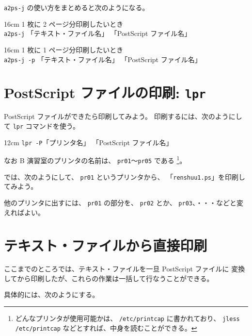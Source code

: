  \texttt{a2ps-j} の使い方をまとめると次のようになる。

\begin{coml}{16cm}
{\normalsize 1 枚に 2 ページ分印刷したいとき}\\
\texttt{a2ps-j} 「テキスト・ファイル名」 \TG 「PostScript ファイル名」
\end{coml}

\begin{coml}{16cm}
{\normalsize 1 枚に 1 ページ分印刷したいとき}\\
\texttt{a2ps-j -p} 「テキスト・ファイル名」 \TG 「PostScript ファイル名」
\end{coml}


\section{PostScript ファイルの印刷: \texttt{lpr}}

PostScript ファイルができたら印刷してみよう。
印刷するには、次のようにして \texttt{lpr} コマンドを使う。

\begin{coml}{12cm}
\texttt{lpr -P}「プリンタ名」 「PostScript ファイル名」
\smallskip
\end{coml}

なお B 演習室のプリンタの名前は、 \texttt{pr01}〜\texttt{pr05} である
\footnote{どんなプリンタが使用可能かは、 \texttt{/etc/printcap} に書かれており、
 \texttt{jless /etc/printcap} などとすれば、中身を読むことができる。}。

では、次のようにして、 \texttt{pr01} というプリンタから、
「\texttt{renshuu1.ps}」を印刷してみよう。

\begin{progls}
\end{progls}

他のプリンタに出すには、 \texttt{pr01} の部分を、 \texttt{pr02} とか、
 \texttt{pr03}、・・・などと変えればよい。

\section{テキスト・ファイルから直接印刷}

ここまでのところでは、テキスト・ファイルを一旦 PostScript ファイルに
変換してから印刷したが、これらの作業は一括して行なうことができる。

具体的には、次のようにする。

